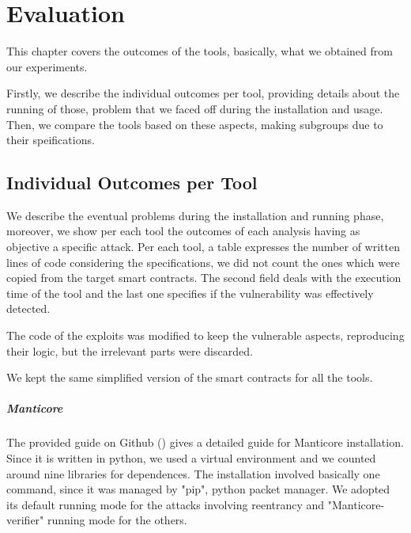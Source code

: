 
\chapter{Evaluation}
\label{ch:Evaluation}
This chapter covers the outcomes of the tools, basically, what we obtained from our experiments. 

Firstly, we describe the individual outcomes per tool, providing details about the running of those, problem that we faced off during the installation and usage. 
Then, we compare the tools based on these aspects, making subgroups due to their speifications.



\section{Individual Outcomes per Tool}

We describe the eventual problems during the installation and running phase, moreover, we show per each tool the outcomes of each analysis having as objective a specific attack. 
Per each tool, a table expresses the number of written lines of code considering the specifications, we did not count the ones which were copied from the target smart contracts. 
The second field deals with the execution time of the tool and the last one specifies if the vulnerability was effectively detected.

The code of the exploits was modified to keep the vulnerable aspects, reproducing their logic, but the irrelevant parts were discarded.

We kept the same simplified version of the smart contracts for all the tools.

\paragraph{Manticore} The provided guide on Github (\cite{ManticoreGitHub}) gives a detailed guide for Manticore installation. 
Since it is written in python, we used a virtual environment and we counted around nine libraries for dependences. The installation involved basically one command, since it was managed by "pip", python packet manager.
We adopted its default running mode for the attacks involving reentrancy and "Manticore-verifier" running mode for the others. 

